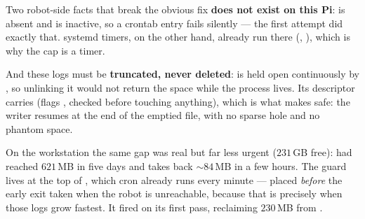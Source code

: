 \begin{trapbox}{Two robot-side facts that break the obvious fix}
 \textbf{does not exist on this Pi}:  is
absent and  is inactive, so a crontab entry fails
silently --- the first attempt did exactly that. systemd timers, on the other
hand, already run there (, ), which is why the
cap is a timer.

And these logs must be \textbf{truncated, never deleted}: 
is held open continuously by , so unlinking it would not return
the space while the process lives. Its descriptor carries 
(flags , checked before touching anything), which is what
makes  safe: the writer resumes at the end of the emptied
file, with no sparse hole and no phantom space.
\end{trapbox}

\noindent On the workstation the same gap was real but far less urgent
($231$\,GB free):  had reached $621$\,MB in five
days and takes back $\sim\!84$\,MB in a few hours. The guard lives at the top
of , which cron already runs every minute --- placed
\emph{before} the early exit taken when the robot is unreachable, because
that is precisely when those logs grow fastest. It fired on its first pass,
reclaiming $230$\,MB from .


